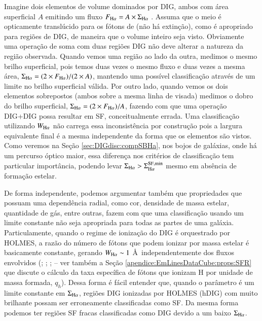 Imagine dois elementos de volume dominados por DIG, ambos com área superficial $A$ emitindo um fluxo $F_{\Ha}=A\times\Sigma_{\Ha}$ . Assuma que o meio é opticamente translúcido para os fótons de \Ha (não há extinção), como é apropriado para regiões de DIG, de maneira que o volume inteiro seja visto. Obviamente uma operação de soma com duas regiões DIG não deve alterar a natureza da região observada. Quando vemos uma região ao lado da outra, medimos o mesmo brilho superficial, pois temos duas vezes o mesmo fluxo e duas vezes a mesma área, $\Sigma_{\Ha}=(2 \times F_{\Ha})/(2 \times A)$, mantendo uma possível classificação através de um limite no brilho superficial válida. Por outro lado, quando vemos os dois elementos sobrepostos (ambos sobre a mesma linha de visada) medimos o dobro do brilho superficial, $\Sigma_{\Ha}=(2 \times F_{\Ha})/A$, fazendo com que uma operação DIG+DIG possa resultar em SF, conceitualmente errada.
Uma classificação utilizando $W_{\Ha}$ não carrega essa inconsistência por construção pois a largura equivalente final é a mesma independente da forma que os elementos são vistos. Como veremos na Seção \ref{sec:DIGdisc:compSBHa}, nos bojos de galáxias, onde há um percurso óptico maior, essa diferença nos critérios de classificação tem particular importância, podendo levar $\Sigma_{\Ha} > \Sigma_{\Ha}^{\rm SF,min}$ mesmo em absência de formação estelar.

De forma independente, podemos argumentar também que propriedades que possuam uma dependência radial, como cor, densidade de massa estelar, quantidade de gás, entre outras, fazem com que uma classificação usando um limite constante não seja apropriada para todas as partes de uma galáxia. Particulamente, quando o regime de ionização do DIG é orquestrado por HOLMES, a razão do número de fótons que podem ionizar \Ha por massa estelar é basicamente constante, gerando $W_{\Ha} \sim 1$ \AA\ independentemente dos fluxos envolvidos (\citealt{Binette.etal.1994a}; \citealt{CidFernandes.etal.2011a}; \citealt{Belfiore.etal.2016}; -- ver também a Seção \ref{apendice:EmLinesDataCube:props:SFR} que discute o cálculo da taxa específica de fótons que ionizam H por unidade de massa formada, $q_h$). Dessa forma é fácil entender que, quando o parâmetro é um limite constante em $\Sigma_{\Ha}$, regiões DIG ionizadas por HOLMES (hDIG) com \Ha muito brilhante possam ser erroneamente classificadas como SF. Da mesma forma podemos ter regiões SF fracas classificadas como DIG devido a um baixo $\Sigma_{\Ha}$.

